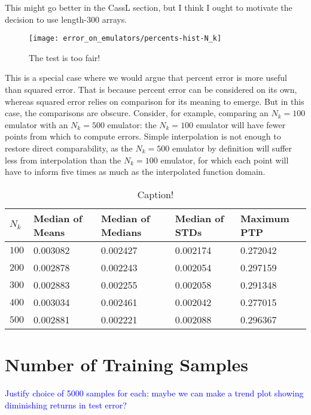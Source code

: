 This might go better in the CassL section, but I think I ought to motivate the 
decision to use length-300 arrays.

\begin{figure}[ht!]
  \centering
  \texttt{[image: error\_on\_emulators/percents-hist-N\_k]}
  \caption[Impact of $N_k$ on Accuracy]{The test is too fair!}
  \label{fig: Nk_experiment}
\end{figure}

This is a special case where we would argue that percent error is more useful 
than squared error.
That is because percent error can be considered on its own, whereas squared
error relies on comparison for its meaning to emerge. But in this case, the
comparisons are obscure. Consider, for example, comparing an $N_k = 100$
emulator with an $N_k = 500$ emulator: the $N_k = 100$ emulator will have
fewer points from which to compute errors. Simple interpolation is not enough
to restore direct comparability, as the $N_k = 500$ emulator by definition
will suffer less from interpolation than the $N_k = 100$ emulator, for which
each point will have to inform five times as much as the interpolated function
domain.

\begin{table}[ht!]
\centering
\begin{tabular}{l|l|l|l|l}
\hline
$N_k$ & Median of Means & Median of Medians & Median of STDs & Maximum PTP \\ \hline
$100$ & 0.003082 & 0.002427 & 0.002174 & 0.272042 \\
$200$ & 0.002878 & 0.002243 & 0.002054 & 0.297159 \\
$300$ & 0.002883 & 0.002255 & 0.002058 & 0.291348 \\
$400$ & 0.003034 & 0.002461 & 0.002042 & 0.277015 \\
$500$ & 0.002881 & 0.002221 & 0.002088 & 0.296367 \\
\end{tabular}
	\cprotect\caption[$N_k$ Experiment: Percent Error Statistics]{Caption!}
 \label{tab: Nk_experiment_percerr_stats}
\end{table}

\section{Number of Training Samples}
\label{sec: num_samples}

\textcolor{blue}{Justify choice of 5000 samples for each: maybe we can make a
trend plot showing diminishing returns in test error?}

